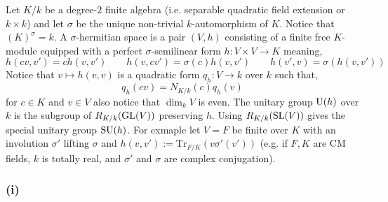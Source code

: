 \documentclass[12pt]{article}
\begin{document}
Let $K/k$ be a degree-$2$ finite \etale algebra (i.e. separable quadratic field extension or $k \times k$) and let $\sigma$ be the unique non-trivial $k$-automorphism of $K$. Notice that $(K)^\sigma = k$. A $\sigma$-hermitian space is a pair $(V, h)$ consisting of a finite free $K$-module equipped with a perfect $\sigma$-semilinear form $h : V \times V \to K$ meaning,
\[ h(cv, v') = ch(v,v') \quad \quad h(v,cv') = \sigma(c) h(v,v') \quad \quad h(v',v) = \sigma(h(v,v')) \]
Notice that $v \mapsto h(v,v)$ is a quadratic form $q_h : V \to k$ over $k$ such that,
\[ q_h(cv) = N_{K/k}(c) q_h(v) \]
for $c \in K$ and $v \in V$ also notice that $\dim_k{V}$ is even. The unitary group $\mathrm{U}(h)$ over $k$ is the subgroup of $R_{K/k}(\mathrm{GL}(V))$ preserving $h$. Using $R_{K/k}(\mathrm{SL}(V))$ gives the special unitary group $\mathrm{SU}(h)$. For exmaple let $V = F$ be finite \etale over $K$ with an involution $\sigma'$ lifting $\sigma$ and $h(v,v') := \mathrm{Tr}_{F/K}(v \sigma'(v'))$ (e.g. if $F,K$ are CM fields, $k$ is totally real, and $\sigma'$ and $\sigma$ are complex conjugation).

\subsubsection{(i)}
\end{document}
